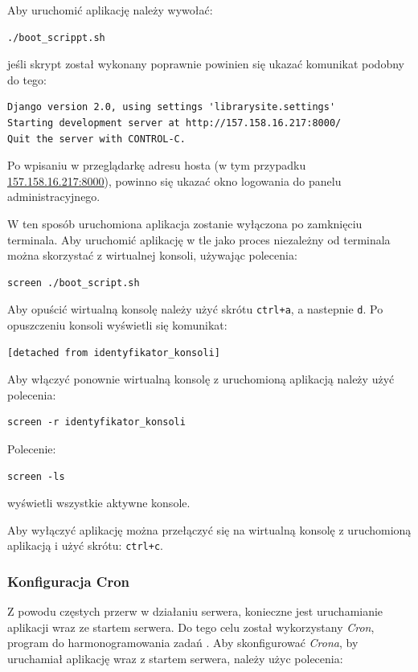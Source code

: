 \documentclass[twoside]{projektInzynierskiMS}
\begin{document}
Aby uruchomić aplikację należy wywołać:

\begin{verbatim}
./boot_scrippt.sh
\end{verbatim}

jeśli skrypt został wykonany poprawnie powinien się ukazać komunikat podobny do tego:

\begin{verbatim}
Django version 2.0, using settings 'librarysite.settings'
Starting development server at http://157.158.16.217:8000/
Quit the server with CONTROL-C.
\end{verbatim}

Po wpisaniu w przeglądarkę adresu hosta (w tym przypadku \href{http://157.158.16.217:8000/}{157.158.16.217:8000}), powinno się ukazać okno logowania do panelu administracyjnego.

W ten sposób uruchomiona aplikacja zostanie wyłączona po zamknięciu terminala. Aby uruchomić aplikację w tle jako proces niezależny od terminala można skorzystać z wirtualnej konsoli, używając polecenia:
\begin{verbatim}
screen ./boot_script.sh
\end{verbatim}
Aby opuścić wirtualną konsolę należy użyć skrótu \verb`ctrl+a`, a nastepnie \verb`d`. Po opuszczeniu konsoli wyświetli się komunikat:
\begin{verbatim}
[detached from identyfikator_konsoli]
\end{verbatim}

Aby włączyć ponownie wirtualną konsolę z uruchomioną aplikacją należy użyć polecenia:

\begin{verbatim}
screen -r identyfikator_konsoli
\end{verbatim}

Polecenie: 

\begin{verbatim}
screen -ls
\end{verbatim}

wyświetli wszystkie aktywne konsole.

Aby wyłączyć aplikację można przełączyć się na wirtualną konsolę z uruchomioną aplikacją i użyć skrótu: \verb`ctrl+c`.
\subsubsection{Konfiguracja Cron}

Z powodu częstych przerw w działaniu serwera, konieczne jest uruchamianie aplikacji wraz ze startem serwera. Do tego celu został wykorzystany \textit{Cron}, program do harmonogramowania zadań \cite{linuxAdmin}. Aby skonfigurować \textit{Crona}, by uruchamiał aplikację wraz z startem serwera, należy użyc polecenia:
\end{document}
